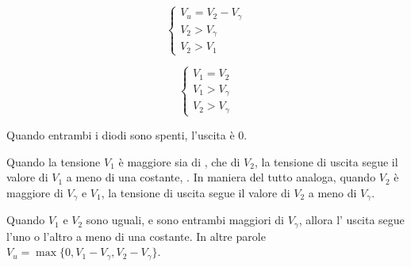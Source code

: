 \documentclass[../elettronica]{subfiles}
\begin{document}
\begin{minipage}[b]{.45\textwidth}
    \begin{tcolorbox}[title=D1 OFF e D2 ON]
        \[\begin{cases}
            V_u = V_{2} - V_\gamma
            \\
            V_{2} > V_\gamma
            \\
            V_{2} > V_{1}
        \end{cases}\]
    \end{tcolorbox}
\end{minipage}
\begin{minipage}[b]{.45\textwidth}
    \begin{tcolorbox}[title=D1 ON e D2 ON]
        \[\begin{cases}
            V_{1} = V_{2}
            \\
            V_{1} > V_\gamma
            \\
            V_{2} > V_\gamma
        \end{cases}\]
    \end{tcolorbox}
\end{minipage}

Quando entrambi i diodi sono spenti, l'uscita è 0.

Quando la tensione $V_{1}$ è maggiore sia di \vgg, che di $V_{2}$, la tensione di uscita segue il
valore di $V_{1}$ a meno di una costante, \vgg.
In maniera del tutto analoga, quando $V_{2}$ è maggiore di $V_\gamma$ e $V_{1}$, la tensione di uscita
segue il valore di $V_{2}$ a meno di $V_\gamma$.

Quando $V_1$ e $V_2$ sono uguali, e sono entrambi maggiori di $V_\gamma$, allora l'
uscita segue l'uno o l'altro a meno di una costante.
In altre parole $V_u = \max{\big\{0, V_1 - V_\gamma, V_2 - V_\gamma\big\}}$.

\begin{figure}[h]
    \centering
    \begin{minipage}[b]{.45\textwidth}
    \end{minipage}
    \begin{minipage}[b]{.45\textwidth}
    \end{minipage}
\end{figure}
\end{document}
